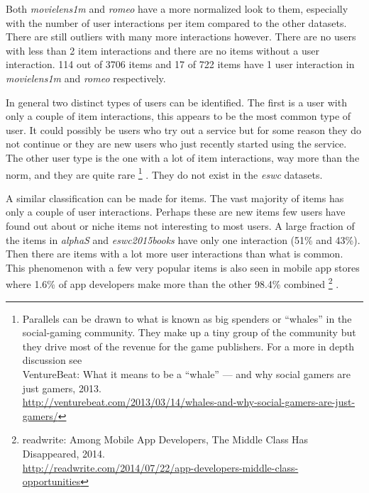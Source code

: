 \newpage



Both \textit{movielens1m} and \textit{romeo} have a more normalized look to them, especially with the number of user interactions per item compared to the other datasets. There are still outliers with many more interactions however. There are no users with less than 2 item interactions and there are no items without a user interaction. 114 out of 3706 items and 17 of 722 items have 1 user interaction in \textit{movielens1m} and \textit{romeo} respectively.

\FloatBarrier

In general two distinct types of users can be identified. The first is a user with only a couple of item interactions, this appears to be the most common type of user. It could possibly be users who try out a service but for some reason they do not continue or they are new users who just recently started using the service. The other user type is the one with a lot of item interactions, way more than the norm, and they are quite rare
\footnote{Parallels can be drawn to what is known as big spenders or ``whales'' in the social-gaming community. They make up a tiny group of the community but they drive most of the revenue for the game publishers. For a more in depth discussion see \\
VentureBeat: What it means to be a ``whale'' — and why social gamers are just gamers, 2013. \\
\url{http://venturebeat.com/2013/03/14/whales-and-why-social-gamers-are-just-gamers/} }
. They do not exist in the \textit{eswc} datasets.

A similar classification can be made for items. The vast majority of items has only a couple of user interactions. Perhaps these are new items few users have found out about or niche items not interesting to most users. 
A large fraction of the items in \textit{alphaS} and \textit{eswc2015books} have only one interaction (51\% and 43\%).  Then there are items with a lot more user interactions than what is common.
This phenomenon with a few very popular items is also seen in mobile app stores where 1.6\% of app developers make more than the other 98.4\% combined
\footnote{
readwrite: Among Mobile App Developers, The Middle Class Has Disappeared, 2014. \\
\url{http://readwrite.com/2014/07/22/app-developers-middle-class-opportunities}
}
.

